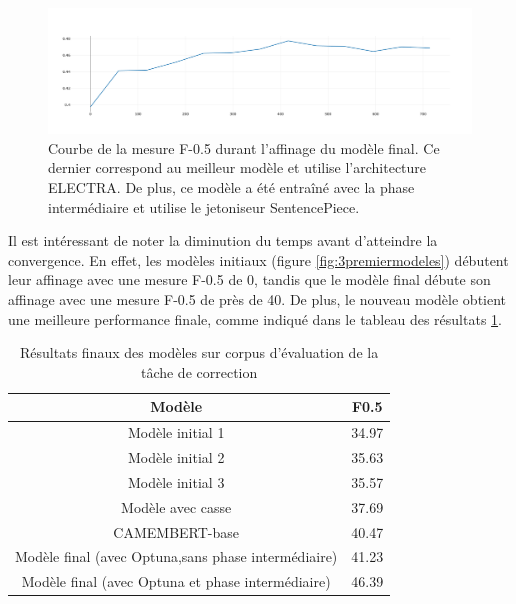 \documentclass[12pt,twoside,rapport]{dms}
\theoremstyle{definition}
\numberwithin{equation}{section}
\numberwithin{table}{chapter}
\numberwithin{figure}{chapter}
\begin{document}
\begin{figure}
	\begin{center}
		\includegraphics[width=1.0\textwidth]{figures/meilleurmodelenatf05.png}
	\end{center}
	\caption{Courbe de la mesure F-0.5 durant l'affinage du modèle final. Ce dernier correspond au meilleur modèle et utilise l'architecture ELECTRA. De plus, ce modèle a été entraîné avec la phase intermédiaire et utilise le jetoniseur SentencePiece.}\label{fig:meilleurmodeleaweb}
\end{figure}
Il est intéressant de noter la diminution du temps avant d'atteindre la
convergence. En effet, les modèles initiaux (figure \ref{fig:3premiermodeles})
débutent leur affinage avec une mesure F-0.5 de 0, tandis que le modèle final
débute son affinage avec une mesure F-0.5 de près de 40. De plus, le nouveau
modèle obtient une meilleure performance finale, comme indiqué dans le tableau des
résultats \ref{table:resultatfinaux}.
\begin{table}
	\centering
	\begin{tabular}{||c | c||}
		\hline
		Modèle                                              & F0.5  \\ [0.5ex]
		\hline\hline
		Modèle initial 1                                    & 34.97 \\
		Modèle initial 2                                    & 35.63 \\
		Modèle initial 3                                    & 35.57 \\
		Modèle avec casse                                   & 37.69 \\
		CAMEMBERT-base                                      & 40.47 \\
		Modèle final (avec Optuna,sans phase intermédiaire) & 41.23 \\
		Modèle final  (avec Optuna et phase intermédiaire)  & 46.39 \\
		\hline
	\end{tabular}
	\caption{Résultats finaux des modèles sur corpus d'évaluation de la tâche de correction}
	\label{table:resultatfinaux}
\end{table}
\end{document}
